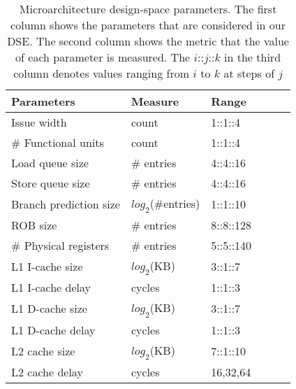 
\begin{table}[p]
\large
\centering
\captionsetup{width=.9\columnwidth}
\caption{\small Microarchitecture design-space parameters. The first column shows the parameters that are considered in our DSE. The second column shows the metric that the value of each parameter is measured. The $i$::$j$::$k$ in the third column denotes values ranging from $i$ to $k$ at steps of $j$}
\renewcommand*{\arraystretch}{1.4}
\renewcommand*{\tabcolsep}{25pt}
\resizebox{.9\columnwidth}{!}
{
	\begin{tabular}{l l l l l l}
	\toprule[0.15em]
		\bigstrut\textbf{Parameters} & \bigstrut\textbf{Measure} & \bigstrut\textbf{Range}\\
	\midrule[0.05em]
		Issue width				&	count					&	1::1::4	\\
		\# Functional units		&	count					&	1::1::4 \\
		Load queue size			&	\# entries				&	4::4::16 \\
		Store queue size		&	\# entries				&	4::4::16 \\
        Branch prediction size  &   $log_{2}$(\#entries)    &   1::1::10\\
		ROB size				&	\# entries				&	8::8::128 \\
		\# Physical registers	&	\# entries				&	5::5::140 \\
		L1 I-cache size			&	$log_{2}$(KB)			&	3::1::7 \\
		L1 I-cache delay		&	cycles					&	1::1::3 \\
		L1 D-cache size			&	$log_{2}$(KB)			&	3::1::7 \\
		L1 D-cache delay		&	cycles					&	1::1::3\\
		L2 cache size			&	$log_{2}$(KB)			&	7::1::10 \\
		L2 cache delay			&	cycles					&	16,32,64 \\
	\bottomrule[0.15em]
	\end{tabular}
}
\label{tab:dse:para}
\end{table}
